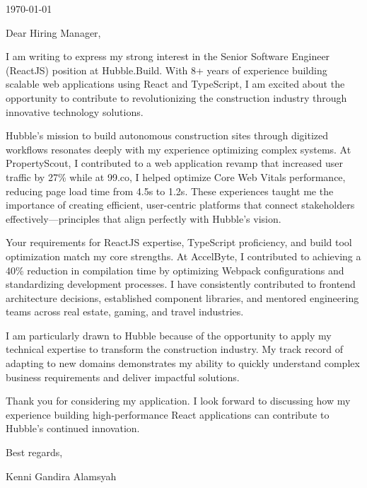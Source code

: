 \documentclass[a4paper, 11pt]{article}
\newcommand{\link}[2]{{\color[HTML]{096dd9}\href[pdfnewwindow=true]{#1}{#2}}}
\begin{document}

\vspace{10pt}

\today

\vspace{10pt}

Dear Hiring Manager,

I am writing to express my strong interest in the Senior Software Engineer (ReactJS) position at Hubble.Build. With 8+ years of experience building scalable web applications using React and TypeScript, I am excited about the opportunity to contribute to revolutionizing the construction industry through innovative technology solutions.

Hubble's mission to build autonomous construction sites through digitized workflows resonates deeply with my experience optimizing complex systems. At PropertyScout, I contributed to a web application revamp that increased user traffic by 27\% while at 99.co, I helped optimize Core Web Vitals performance, reducing page load time from 4.5s to 1.2s. These experiences taught me the importance of creating efficient, user-centric platforms that connect stakeholders effectively—principles that align perfectly with Hubble's vision.

Your requirements for ReactJS expertise, TypeScript proficiency, and build tool optimization match my core strengths. At AccelByte, I contributed to achieving a 40\% reduction in compilation time by optimizing Webpack configurations and standardizing development processes. I have consistently contributed to frontend architecture decisions, established component libraries, and mentored engineering teams across real estate, gaming, and travel industries.

I am particularly drawn to Hubble because of the opportunity to apply my technical expertise to transform the construction industry. My track record of adapting to new domains demonstrates my ability to quickly understand complex business requirements and deliver impactful solutions.

Thank you for considering my application. I look forward to discussing how my experience building high-performance React applications can contribute to Hubble's continued innovation.

\vspace{10pt}

Best regards,

Kenni Gandira Alamsyah
\end{document}
